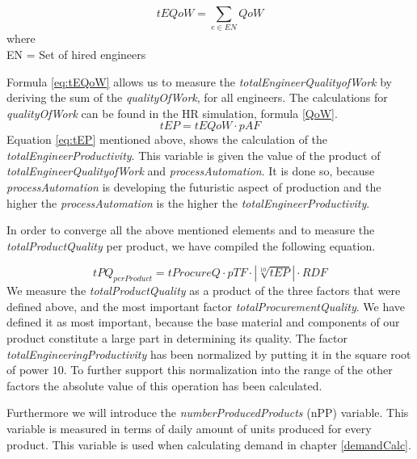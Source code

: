 \begin{center}
\begin{equation}
tEQoW=\sum_{e \in EN}{QoW}
\label{eq:tEQoW}
\end{equation}
where \\
\gls{EN} = Set of hired engineers
\end{center}
Formula \ref{eq:tEQoW} allows us to measure the \textit{totalEngineerQualityofWork} by deriving the sum of the \textit{qualityOfWork}, for all engineers. The calculations for \textit{qualityOfWork} can be found in the HR simulation, formula \ref{QoW}.
\begin{equation}
tEP=tEQoW \cdot pAF
\label{eq:tEP}
\end{equation}
Equation \ref{eq:tEP} mentioned above, shows the calculation of the \textit{totalEngineerProductivity}. This variable is given the value of the product of \textit{totalEngineerQualityofWork} and \textit{processAutomation}. It is done so, because \textit{processAutomation} is developing the futuristic  aspect of production and the higher the \textit{processAutomation} is the higher the \textit{totalEngineerProductivity}. 

In order to converge all the above mentioned elements and to measure the \textit{totalProductQuality} per product, we have compiled the following equation. 

\begin{equation}
tPQ_{perProduct} = tProcureQ \cdot pTF \cdot |\sqrt[10]{tEP}| \cdot  RDF
\label{eq:PQ}
\end{equation}
 We measure the \textit{totalProductQuality} as a product of the three factors that were defined above, and the most important factor \textit{totalProcurementQuality}. We have defined it as most important, because the base material and components of our product constitute a large part in determining its quality.
 The factor \textit{totalEngineeringProductivity}
 has been normalized by putting it in the square root of power $10$. 
 To further support this normalization into the range of the other factors the absolute value of this operation has been calculated.
 
 Furthermore we will introduce the \textit{numberProducedProducts} (\gls{nPP}) variable. This variable is measured in terms of daily amount of units produced for every product. This variable is used when calculating demand in chapter \ref{demandCalc}. %
 
